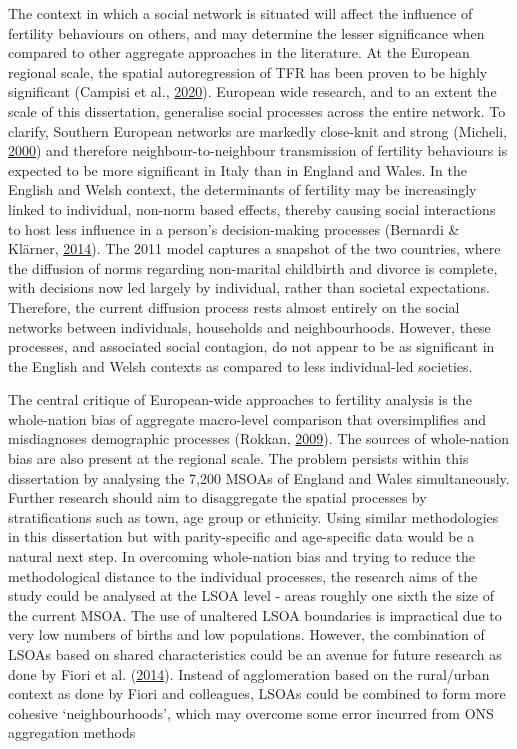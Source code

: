 \documentclass[12pt,twoside]{reedthesis}
\begin{document}
The context in which a social network is situated will affect the influence of fertility behaviours on others, and may determine the lesser significance when compared to other aggregate approaches in the literature. At the European regional scale, the spatial autoregression of TFR has been proven to be highly significant (Campisi et al., \protect\hyperlink{ref-campisi2020}{2020}). European wide research, and to an extent the scale of this dissertation, generalise social processes across the entire network. To clarify, Southern European networks are markedly close-knit and strong (Micheli, \protect\hyperlink{ref-micheli2000}{2000}) and therefore neighbour-to-neighbour transmission of fertility behaviours is expected to be more significant in Italy than in England and Wales. In the English and Welsh context, the determinants of fertility may be increasingly linked to individual, non-norm based effects, thereby causing social interactions to host less influence in a person's decision-making processes (Bernardi \& Klärner, \protect\hyperlink{ref-bernardi2014}{2014}). The 2011 model captures a snapshot of the two countries, where the diffusion of norms regarding non-marital childbirth and divorce is complete, with decisions now led largely by individual, rather than societal expectations. Therefore, the current diffusion process rests almost entirely on the social networks between individuals, households and neighbourhoods. However, these processes, and associated social contagion, do not appear to be as significant in the English and Welsh contexts as compared to less individual-led societies.

The central critique of European-wide approaches to fertility analysis is the whole-nation bias of aggregate macro-level comparison that oversimplifies and misdiagnoses demographic processes (Rokkan, \protect\hyperlink{ref-rokkan2009}{2009}). The sources of whole-nation bias are also present at the regional scale. The problem persists within this dissertation by analysing the 7,200 MSOAs of England and Wales simultaneously. Further research should aim to disaggregate the spatial processes by stratifications such as town, age group or ethnicity. Using similar methodologies in this dissertation but with parity-specific and age-specific data would be a natural next step. In overcoming whole-nation bias and trying to reduce the methodological distance to the individual processes, the research aims of the study could be analysed at the LSOA level - areas roughly one sixth the size of the current MSOA. The use of unaltered LSOA boundaries is impractical due to very low numbers of births and low populations. However, the combination of LSOAs based on shared characteristics could be an avenue for future research as done by Fiori et al. (\protect\hyperlink{ref-fiori2014}{2014}). Instead of agglomeration based on the rural/urban context as done by Fiori and colleagues, LSOAs could be combined to form more cohesive `neighbourhoods', which may overcome some error incurred from ONS aggregation methods
\end{document}

